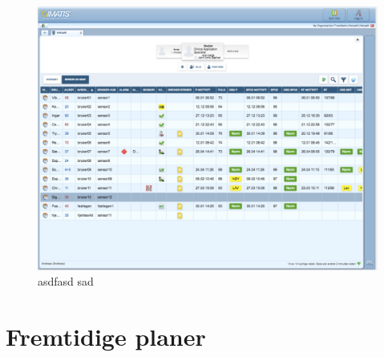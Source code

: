 \begin{figure}
\includegraphics[width=1.0\textwidth,center]{fig/helsami/tk_11_sensoroggraf}
\caption{asdfasd sad}
\label{fig:helsami1}
\end{figure}

\section{Fremtidige planer}
